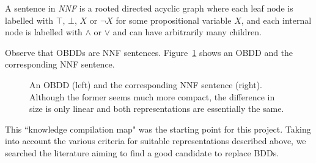 \documentclass[11pt]{article}
\newenvironment{definition}[1][Definition]{\begin{trivlist}
\item[\hskip \labelsep {\bfseries #1}]}{\end{trivlist}}
\begin{document}
\begin{definition}
A sentence in \textit{NNF} is a rooted directed acyclic graph where each leaf node is labelled with $\top$, $\bot$, $X$ or $\lnot X$ for some propositional variable $X$, and each internal node is labelled with $\land$ or $\lor$ and can have arbitrarily many children. 

\end{definition} 

\noindent Observe that OBDDs are NNF sentences. Figure~\ref{nnf_obdd} shows an OBDD and the corresponding NNF sentence.  

\begin{figure}
\centering
{}
\qquad\quad 
{}

	\caption{An OBDD (left) and the corresponding NNF sentence (right). Although the former seems much more compact, the difference in size is only linear and both representations are essentially the same.}
\label{nnf_obdd}

\end{figure}
 
 This ``knowledge compilation map" was the starting point for this project. Taking into account the various criteria for suitable representations described above, we searched the literature aiming to find a good candidate to replace BDDs. 
\end{document}
